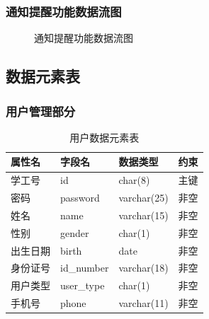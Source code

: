 \documentclass{article}
\begin{document}
\subsubsection{通知提醒功能数据流图}

\begin{figure}[H]
    \centering
    \caption{通知提醒功能数据流图}
\end{figure}

\subsection{数据元素表}
\subsubsection{用户管理部分}

\begin{table}[H]
    \centering
    \begin{tabularx}{\textwidth}{|>{\raggedright\arraybackslash}X|>{\raggedright\arraybackslash}X|>{\raggedright\arraybackslash}X|>{\raggedright\arraybackslash}X|}
    \toprule
    \textbf{属性名} & \textbf{字段名} & \textbf{数据类型} & \textbf{约束} \\ \midrule
    学工号 & id & char(8) & 主键 \\ \midrule
    密码 & password & varchar(25) & 非空 \\ \midrule
    姓名 & name & varchar(15) & 非空 \\ \midrule
    性别 & gender & char(1) & 非空 \\ \midrule
    出生日期 & birth & date & 非空 \\ \midrule
    身份证号 & id\_number & varchar(18) & 非空 \\ \midrule
    用户类型 & user\_type & char(1) & 非空 \\ \midrule
    手机号 & phone & varchar(11) & 非空 \\ \bottomrule
    \end{tabularx}
    \caption{用户数据元素表}
    \label{tab:student_user_elements}
\end{table}
\end{document}
